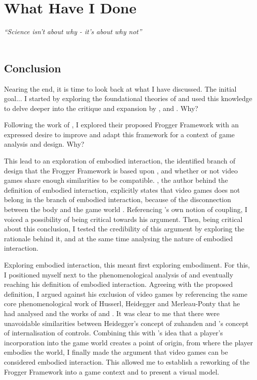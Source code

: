 \chapter{What Have I Done}
\textit{``Science isn't about why - it's about why not''} \\
 \\

\section{Conclusion}
Nearing the end, it is time to look back at what I have discussed. The initial goal... I started by exploring the foundational theories of  and used this knowledge to delve deeper into the critique and expansion by ,  and . Why?

Following the work of , I explored their proposed Frogger Framework with an expressed desire to improve and adapt this framework for a context of game analysis and design. Why?

This lead to an exploration of embodied interaction, the identified branch of design that the Frogger Framework is based upon \cite{frogger}, and whether or not video games share enough similarities to be compatible. , the author behind the definition of embodied interaction, explicitly states that video games does not belong in the branch of embodied interaction, because of the disconnection between the body and the game world \cite{dourish}. Referencing \citeauthor{dourish}'s \citeyear{dourish} own notion of coupling, I voiced a possibility of being critical towards his argument. Then, being critical about this conclusion, I tested the credibility of this argument by exploring the rationale behind it, and at the same time analysing the nature of embodied interaction.

Exploring embodied interaction, this meant first exploring embodiment. For this, I positioned myself next to the phenomenological analysis of  and eventually reaching his definition of embodied interaction. Agreeing with the proposed definition, I argued against his exclusion of video games by referencing the same core phenomenological work of Husserl, Heidegger and Merleau-Ponty that he had analysed and the works of  and . It was clear to me that there were unavoidable similarities between Heidegger's concept of zuhanden and \citeauthor{calleja}'s \citeyear{calleja} concept of internalisation of controls. Combining this with \citeauthor{vella}'s \citeyear{vella} idea that a player's incorporation into the game world creates a point of origin, from where the player embodies the world, I finally made the argument that video games can be considered embodied interaction. This allowed me to establish a reworking of the Frogger Framework into a game context and to present a visual model.


